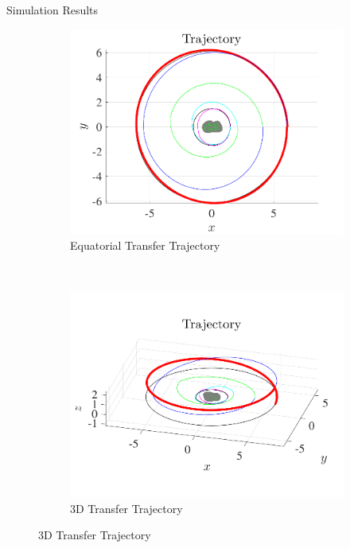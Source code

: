 \documentclass[final, usenames, dvipsnames]{beamer}
\newlength{\twocolwidth}
\begin{document}
\begin{frame}[t]
\begin{columns}[T]
\begin{column}{\twocolwidth}
\begin{block}{Simulation Results}
\begin{figure}[htbp] 
    \centering 
    \begin{subfigure}[htbp]{0.5\textwidth} 
        \includegraphics[width=\textwidth]{figures/trajectory.pdf} 
        \caption{Equatorial Transfer Trajectory}
    \end{subfigure}~ %
    \begin{subfigure}[htbp]{0.5\textwidth} 
        \includegraphics[width=\textwidth]{figures/trajectory_3d.pdf} 
        \caption*{3D Transfer Trajectory}
    \end{subfigure}
 

\end{figure}
\end{block}
\end{column}
\end{columns}
\end{frame}
\end{document}
